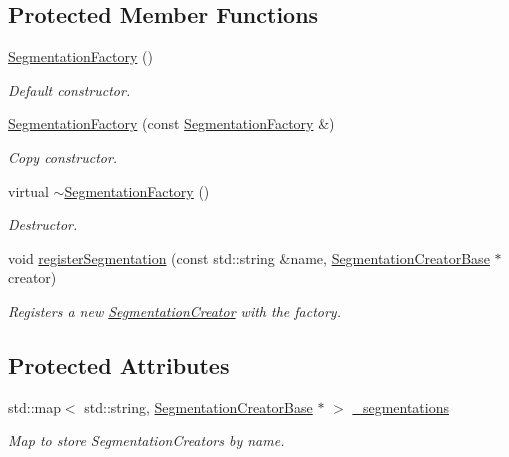 \subsection*{Protected Member Functions}
\begin{DoxyCompactItemize}
\item 
\hyperlink{class_d_d4hep_1_1_d_d_segmentation_1_1_segmentation_factory_af28879ad5d0b45254c69234ec4a90fe5}{Segmentation\+Factory} ()
\begin{DoxyCompactList}\small\item\em Default constructor. \end{DoxyCompactList}\item 
\hyperlink{class_d_d4hep_1_1_d_d_segmentation_1_1_segmentation_factory_a6255e4a05ac17c8e9d14d602dbc9d925}{Segmentation\+Factory} (const \hyperlink{class_d_d4hep_1_1_d_d_segmentation_1_1_segmentation_factory}{Segmentation\+Factory} \&)
\begin{DoxyCompactList}\small\item\em Copy constructor. \end{DoxyCompactList}\item 
virtual \hyperlink{class_d_d4hep_1_1_d_d_segmentation_1_1_segmentation_factory_ad6a96f6c5e29ff089d4c0d4196133d07}{$\sim$\+Segmentation\+Factory} ()
\begin{DoxyCompactList}\small\item\em Destructor. \end{DoxyCompactList}\item 
void \hyperlink{class_d_d4hep_1_1_d_d_segmentation_1_1_segmentation_factory_afb766eaf4c362ae719d29ca764e8cdeb}{register\+Segmentation} (const std\+::string \&name, \hyperlink{class_d_d4hep_1_1_d_d_segmentation_1_1_segmentation_creator_base}{Segmentation\+Creator\+Base} $\ast$creator)
\begin{DoxyCompactList}\small\item\em Registers a new \hyperlink{class_d_d4hep_1_1_d_d_segmentation_1_1_segmentation_creator}{Segmentation\+Creator} with the factory. \end{DoxyCompactList}\end{DoxyCompactItemize}
\subsection*{Protected Attributes}
\begin{DoxyCompactItemize}
\item 
std\+::map$<$ std\+::string, \hyperlink{class_d_d4hep_1_1_d_d_segmentation_1_1_segmentation_creator_base}{Segmentation\+Creator\+Base} $\ast$ $>$ \hyperlink{class_d_d4hep_1_1_d_d_segmentation_1_1_segmentation_factory_a11fdb394993e5ecbd8dcd67ce89a4552}{\+\_\+segmentations}
\begin{DoxyCompactList}\small\item\em Map to store Segmentation\+Creators by name. \end{DoxyCompactList}\end{DoxyCompactItemize}
